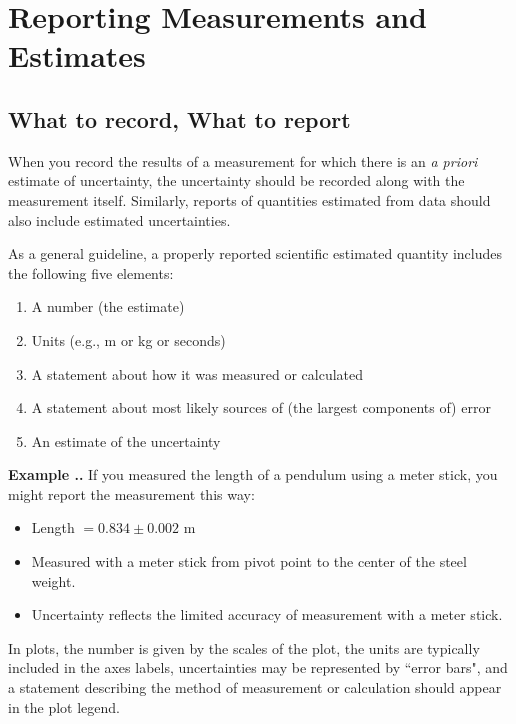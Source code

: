 \documentclass[twoside]{book}\usepackage[]{graphicx}\usepackage[]{xcolor}
\newcounter{example}[section]
\newenvironment{example}%
{\refstepcounter{example}%
\textbf{Example \thesection.\arabic{example}. }}%
{}
\begin{document}
\section{Reporting Measurements and Estimates}

\subsection{What to record, What to report}
 
When you record the results of a measurement for which there is an \emph{a priori}
estimate of uncertainty,  the uncertainty should be recorded along with
the measurement itself.  Similarly, reports of quantities estimated from data
should also include estimated uncertainties.

As a general guideline, a properly reported scientific estimated quantity includes 
the following five elements: 

\begin{enumerate}
\item A number (the estimate)
\item Units (e.g., m  or kg or seconds) 
\item A statement about how it was measured or calculated 
\item A statement about most likely sources of (the largest components of) error
\item An estimate of the uncertainty
\end{enumerate}

\begin{example}
If you measured the length of a pendulum using a meter stick, you
might report the measurement this way: 

\begin{itemize}
	\item
		Length $= 0.834 \pm 0.002$ m 
	\item
Measured with a meter stick from pivot point to the center of the steel weight. 

	\item
Uncertainty reflects the limited accuracy of measurement with a meter stick.
\end{itemize}
\end{example}
In plots, the number is given by the scales of the plot, the units are typically included
in the axes labels, uncertainties may be represented by ``error bars", and a statement 
describing the method of measurement or calculation should appear in the plot legend.
 
\end{document}
